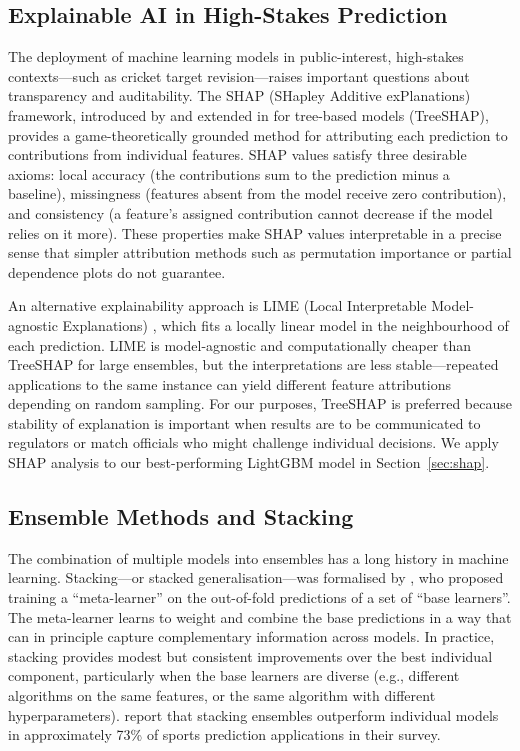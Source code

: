 \documentclass[10pt,a4paper,twocolumn]{article}
\begin{document}
\subsection{Explainable AI in High-Stakes Prediction}

The deployment of machine learning models in public-interest, high-stakes contexts---such as cricket target revision---raises important questions about transparency and auditability. The SHAP (SHapley Additive exPlanations) framework, introduced by \citet{Lundberg2017} and extended in \citet{Lundberg2020} for tree-based models (TreeSHAP), provides a game-theoretically grounded method for attributing each prediction to contributions from individual features. SHAP values satisfy three desirable axioms: local accuracy (the contributions sum to the prediction minus a baseline), missingness (features absent from the model receive zero contribution), and consistency (a feature's assigned contribution cannot decrease if the model relies on it more). These properties make SHAP values interpretable in a precise sense that simpler attribution methods such as permutation importance or partial dependence plots do not guarantee.

An alternative explainability approach is LIME (Local Interpretable Model-agnostic Explanations) \citep{Ribeiro2016}, which fits a locally linear model in the neighbourhood of each prediction. LIME is model-agnostic and computationally cheaper than TreeSHAP for large ensembles, but the interpretations are less stable---repeated applications to the same instance can yield different feature attributions depending on random sampling. For our purposes, TreeSHAP is preferred because stability of explanation is important when results are to be communicated to regulators or match officials who might challenge individual decisions. We apply SHAP analysis to our best-performing LightGBM model in Section~\ref{sec:shap}.

\subsection{Ensemble Methods and Stacking}

The combination of multiple models into ensembles has a long history in machine learning. Stacking---or stacked generalisation---was formalised by \citet{Wolpert1992}, who proposed training a ``meta-learner'' on the out-of-fold predictions of a set of ``base learners''. The meta-learner learns to weight and combine the base predictions in a way that can in principle capture complementary information across models. In practice, stacking provides modest but consistent improvements over the best individual component, particularly when the base learners are diverse (e.g., different algorithms on the same features, or the same algorithm with different hyperparameters). \citet{Bunker2019} report that stacking ensembles outperform individual models in approximately 73\% of sports prediction applications in their survey.
\end{document}
